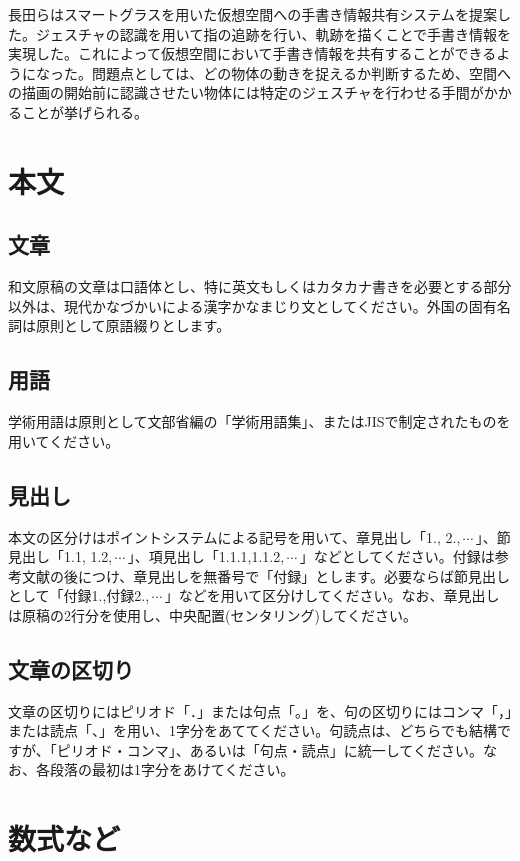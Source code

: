 \documentclass{hissymp}
\begin{document}
長田らはスマートグラスを用いた仮想空間への手書き情報共有システムを提案した。ジェスチャの認識を用いて指の追跡を行い、軌跡を描くことで手書き情報を実現した。これによって仮想空間において手書き情報を共有することができるようになった。問題点としては、どの物体の動きを捉えるか判断するため、空間への描画の開始前に認識させたい物体には特定のジェスチャを行わせる手間がかかることが挙げられる。


\section{本文}

\subsection{文章}
和文原稿の文章は口語体とし、特に英文もしくはカタカナ書きを必要とする部分以外は、現代かなづかいによる漢字かなまじり文としてください。外国の固有名詞は原則として原語綴りとします。
\subsection{用語}
学術用語は原則として文部省編の「学術用語集」、またはJISで制定されたものを用いてください。
\subsection{見出し}
本文の区分けはポイントシステムによる記号を用いて、章見出し「1., 2.,\,$ \cdots $\,」、節見出し「1.1, 1.2,\,$ \cdots $\,」、項見出し「1.1.1,1.1.2,\,$ \cdots $\,」などとしてください。付録は参考文献の後につけ、章見出しを無番号で「付録」とします。必要ならば節見出しとして「付録1.,付録2.,\,$ \cdots $\,」などを用いて区分けしてください。なお、章見出しは原稿の2行分を使用し、中央配置(センタリング)してください。

\subsection{文章の区切り}
文章の区切りにはピリオド「．」または句点「。」を、句の区切りにはコンマ「，」または読点「、」を用い、1字分をあててください。句読点は、どちらでも結構ですが、「ピリオド・コンマ」、あるいは「句点・読点」に統一してください。なお、各段落の最初は1字分をあけてください。


\section{数式など}
\end{document}
